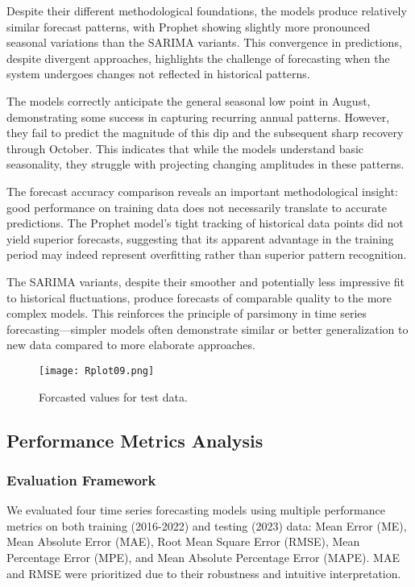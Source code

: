 \documentclass[10pt]{article}
\begin{document}
Despite their different methodological foundations, the models produce relatively similar forecast patterns, with Prophet showing slightly more pronounced seasonal variations than the SARIMA variants. This convergence in predictions, despite divergent approaches, highlights the challenge of forecasting when the system undergoes changes not reflected in historical patterns.

The models correctly anticipate the general seasonal low point in August, demonstrating some success in capturing recurring annual patterns. However, they fail to predict the magnitude of this dip and the subsequent sharp recovery through October. This indicates that while the models understand basic seasonality, they struggle with projecting changing amplitudes in these patterns.

The forecast accuracy comparison reveals an important methodological insight: good performance on training data does not necessarily translate to accurate predictions. The Prophet model's tight tracking of historical data points did not yield superior forecasts, suggesting that its apparent advantage in the training period may indeed represent overfitting rather than superior pattern recognition.

The SARIMA variants, despite their smoother and potentially less impressive fit to historical fluctuations, produce forecasts of comparable quality to the more complex models. This reinforces the principle of parsimony in time series forecasting—simpler models often demonstrate similar or better generalization to new data compared to more elaborate approaches.

\begin{figure}[ht]
\centering
\texttt{[image: Rplot09.png]}
\caption{Forcasted values for test data.}
\label{fig:forcasted_test}
\end{figure}



\subsection{Performance Metrics Analysis}

\subsubsection{Evaluation Framework}
We evaluated four time series forecasting models using multiple performance metrics on both training (2016-2022) and testing (2023) data: Mean Error (ME), Mean Absolute Error (MAE), Root Mean Square Error (RMSE), Mean Percentage Error (MPE), and Mean Absolute Percentage Error (MAPE). MAE and RMSE were prioritized due to their robustness and intuitive interpretation.
\end{document}

